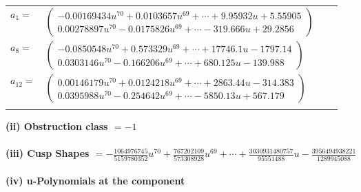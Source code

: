 \documentclass[1p]{elsarticle_modified}
\theoremstyle{definition}
\begin{document}
\begin{tabular}{m{7pt} m{180pt} m{7pt} m{180pt} }
\flushright $a_{1}=$&$\begin{pmatrix}-0.00169434 u^{70}+0.0103657 u^{69}+\cdots+9.95932 u+5.55905\\0.00278897 u^{70}-0.0175826 u^{69}+\cdots-319.666 u+29.2856\end{pmatrix}$ \\
\flushright $a_{8}=$&$\begin{pmatrix}-0.0850548 u^{70}+0.573329 u^{69}+\cdots+17746.1 u-1797.14\\0.0303146 u^{70}-0.166206 u^{69}+\cdots+680.125 u-139.988\end{pmatrix}$ \\
\flushright $a_{12}=$&$\begin{pmatrix}0.00146179 u^{70}+0.0124218 u^{69}+\cdots+2863.44 u-314.383\\0.0395988 u^{70}-0.254642 u^{69}+\cdots-5850.13 u+567.179\end{pmatrix}$\\&\end{tabular}
\flushleft \textbf{(ii) Obstruction class $= -1$}\\~\\
\flushleft \textbf{(iii) Cusp Shapes $= -\frac{1064976745}{5159780352} u^{70}+\frac{767202109}{573308928} u^{69}+\cdots+\frac{3030931480757}{95551488} u-\frac{3956494938221}{1289945088}$}\\~\\
\newpage\renewcommand{\arraystretch}{1}
\flushleft \textbf{(iv) u-Polynomials at the component}\newline \\
\end{document}
